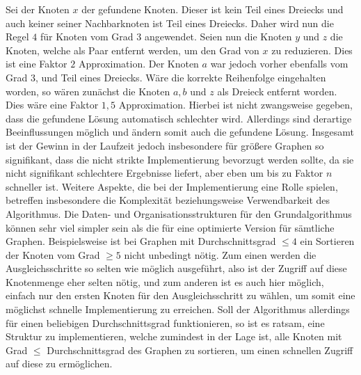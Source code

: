 \documentclass[12pt,onecolumn, notitlepage]{scrartcl}
\begin{document}
\begin{center}
\end{center}
Sei der Knoten $x$ der gefundene Knoten. Dieser ist kein Teil eines Dreiecks und auch keiner seiner Nachbarknoten ist Teil eines Dreiecks. Daher wird nun die Regel $4$ für Knoten vom Grad $3$ angewendet. Seien nun die Knoten $y$ und $z$ die Knoten, welche als Paar entfernt werden, um den Grad von $x$ zu reduzieren. Dies ist eine Faktor $2$ Approximation. Der Knoten $a$ war jedoch vorher ebenfalls vom Grad $3$, und Teil eines Dreiecks. Wäre die korrekte Reihenfolge eingehalten worden, so wären zunächst die Knoten $a, b$ und $z$ als Dreieck entfernt worden. Dies wäre eine Faktor $1,5$ Approximation. \newline
Hierbei ist nicht zwangsweise gegeben, dass die gefundene Lösung automatisch schlechter wird. Allerdings sind derartige Beeinflussungen möglich und ändern somit auch die gefundene Lösung. 
Insgesamt ist der Gewinn in der Laufzeit jedoch insbesondere für größere Graphen so signifikant, dass die nicht strikte Implementierung bevorzugt werden sollte, da sie nicht signifikant schlechtere Ergebnisse liefert, aber eben um bis zu Faktor $n$ schneller ist.\newline
Weitere Aspekte, die bei der Implementierung eine Rolle spielen, betreffen insbesondere die Komplexität beziehungsweise Verwendbarkeit des Algorithmus. Die Daten- und Organisationsstrukturen für den Grundalgorithmus können sehr viel simpler sein als die für eine optimierte Version für sämtliche Graphen. \newline
Beispielsweise ist bei Graphen mit Durchschnittsgrad $\leq 4$ ein Sortieren der Knoten vom Grad $\geq 5$ nicht unbedingt nötig. Zum einen werden die Ausgleichsschritte so selten wie möglich ausgeführt, also ist der Zugriff auf diese Knotenmenge eher selten nötig, und zum anderen ist es auch hier möglich, einfach nur den ersten Knoten für den Ausgleichsschritt zu wählen, um somit eine möglichst schnelle Implementierung zu erreichen. Soll der Algorithmus allerdings für einen beliebigen Durchschnittsgrad funktionieren, so ist es ratsam, eine Struktur zu implementieren, welche zumindest in der Lage ist, alle Knoten mit Grad $\leq$ Durchschnittsgrad des Graphen zu sortieren, um einen schnellen Zugriff auf diese zu ermöglichen. \newline
\end{document}
